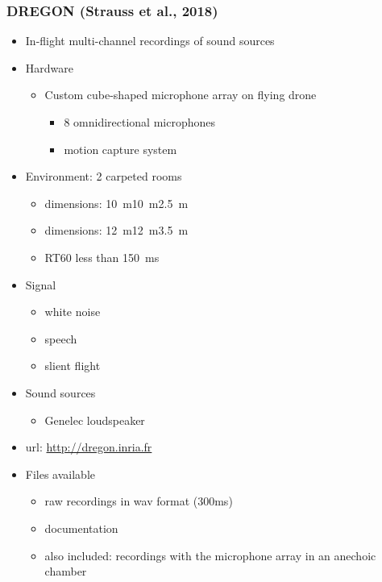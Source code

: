 \documentclass[14pt, legalpaper]{extarticle}
\begin{document}
\subsubsection{DREGON (Strauss et al., 2018)}

\begin{itemize}

\item In-flight multi-channel recordings of sound sources \cite{strauss2018dregon}

\item Hardware
	\begin{itemize}
	\item Custom cube-shaped microphone array on flying drone
		\begin{itemize}
		\item 8 omnidirectional microphones
		\item motion capture system 
		\end{itemize}
	\end{itemize}

\item Environment: 2 carpeted rooms
	\begin{itemize}
	\item dimensions: \SI{10}{\metre}\texttimes\SI{10}{\metre}\texttimes\SI{2.5}{\metre}
	\item dimensions: \SI{12}{\metre}\texttimes\SI{12}{\metre}\texttimes\SI{3.5}{\metre}
	\item RT60 less than \SI{150}{\milli\second}
	\end{itemize}

\item Signal
	\begin{itemize}
	\item white noise
	\item speech
	\item slient flight
	\end{itemize}

\item Sound sources
	\begin{itemize}
	\item Genelec loudspeaker
	\end{itemize}

\item url: \href{http://dregon.inria.fr}{http://dregon.inria.fr} 

\item Files available
	\begin{itemize}
	\item raw recordings in wav format (300ms)
	\item documentation
	\item also included: recordings with the microphone array in an anechoic chamber
	\end{itemize}

\end{itemize}
\end{document}
